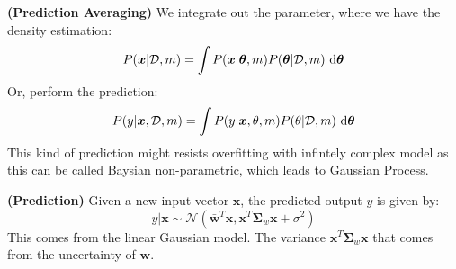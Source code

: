 \begin{definition}{\textbf{(Prediction Averaging)}}
    We integrate out the parameter, where we have the density estimation:
    \begin{equation*}
        P(\boldsymbol x | \mathcal{D}, m) = \int P(\boldsymbol x | \boldsymbol \theta, m)P(\boldsymbol \theta | \mathcal{D}, m)\ \mathrm{d} \boldsymbol \theta
    \end{equation*} 
    Or, perform the prediction:
    \begin{equation*}
        P(y | \boldsymbol x, \mathcal{D}, m) =\int P(y | \boldsymbol x, \theta, m)P(\theta|\mathcal{D}, m)\ \mathrm{d}\boldsymbol \theta
    \end{equation*}
    This kind of prediction might resists overfitting with infintely complex model as this can be called Baysian non-parametric, which leads to Gaussian Process.
\end{definition}

\begin{proposition}{\textbf{(Prediction)}}
    Given a new input vector $\boldsymbol x$, the predicted output $y$ is given by:
    \begin{equation*}
        y | \boldsymbol x \sim \mathcal{N}(\bar{\boldsymbol w}^T\boldsymbol x, \boldsymbol x^T\boldsymbol \Sigma_w\boldsymbol x + \sigma^2)
    \end{equation*}
    This comes from the linear Gaussian model. The variance $\boldsymbol x^T\boldsymbol \Sigma_w\boldsymbol x$ that comes from the uncertainty of $\boldsymbol w$.
\end{proposition}

